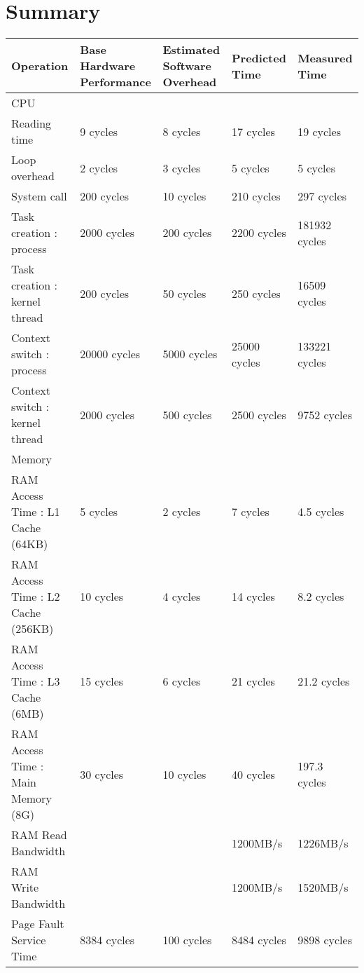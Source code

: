 \chapter{Summary}

\small
\begin{center}
\begin{tabular}{| p{4cm} | p{2.5cm} | p{2.5cm} | p{2.5cm} | p{2.5cm} |}
\hline
Operation  & Base Hardware Performance  & Estimated Software Overhead  & Predicted Time  & Measured Time   \\
\hline 
CPU & & & & \\
\hline
Reading time & 9 cycles & 8 cycles & 17 cycles & 19 cycles \\
Loop overhead & 2 cycles& 3 cycles& 5 cycles& 5 cycles\\
System call & 200 cycles& 10 cycles& 210 cycles& 297 cycles \\
Task creation : process & 2000 cycles& 200 cycles& 2200 cycles& 181932 cycles \\
Task creation : kernel thread    & 200 cycles& 50 cycles& 250 cycles& 16509 cycles\\
Context switch : process & 20000 cycles& 5000 cycles& 25000 cycles& 133221  cycles\\
Context switch : kernel thread    & 2000 cycles& 500 cycles& 2500 cycles& 9752 cycles\\
\hline 
Memory & & & & \\
\hline
RAM Access Time : L1 Cache (64KB) &   5 cycles  & 2 cycles & 7 cycles &  4.5 cycles \\
RAM Access Time : L2 Cache (256KB) & 10 cycles & 4 cycles & 14 cycles &  8.2 cycles\\
RAM Access Time : L3 Cache (6MB) & 15 cycles & 6 cycles & 21 cycles  & 21.2 cycles\\
RAM Access Time : Main Memory (8G) & 30 cycles & 10 cycles & 40 cycles & 197.3 cycles\\
RAM Read Bandwidth & & & 1200MB/s & 1226MB/s \\
RAM Write Bandwidth & & & 1200MB/s & 1520MB/s \\
Page Fault Service Time & 8384 cycles& 100 cycles& 8484 cycles& 9898 cycles\\
\end{tabular}
\end{center}



